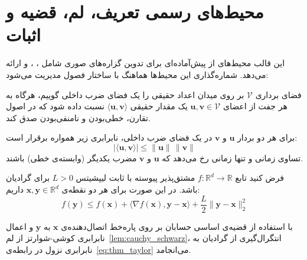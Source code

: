 \section{محیط‌های رسمی تعریف، لم، قضیه و اثبات}\label{sec:2-3}

این قالب محیط‌های از پیش‌آماده‌ای برای تدوین گزاره‌های صوری شامل ، ،  و  ارائه می‌دهد. شماره‌گذاری این محیط‌ها هماهنگ با ساختار فصول مدیریت می‌شود:

\begin{definition}\label{def:inner_product_space}
فضای برداری $\mathcal{V}$ بر روی میدان اعداد حقیقی را یک فضای ضرب داخلی گوییم، هرگاه به هر جفت از اعضای $\mathbf{u}, \mathbf{v} \in \mathcal{V}$ یک مقدار حقیقی $\langle \mathbf{u}, \mathbf{v} \rangle$ نسبت داده شود که در اصول تقارن، خطی‌بودن و نامنفی‌بودن صدق کند.
\end{definition}

\begin{lemma}\label{lem:cauchy_schwarz}
برای هر دو بردار $\mathbf{u}$ و $\mathbf{v}$ در یک فضای ضرب داخلی، نابرابری زیر همواره برقرار است:
\begin{equation}\label{eq:cauchy_schwarz}
    |\langle \mathbf{u}, \mathbf{v} \rangle| \le \|\mathbf{u}\| \, \|\mathbf{v}\|
\end{equation}
تساوی زمانی و تنها زمانی رخ می‌دهد که $\mathbf{u}$ و $\mathbf{v}$ مضرب یکدیگر (وابسته‌ی خطی) باشند.
\end{lemma}

\begin{theorem}\label{thm:taylor_bound}
فرض کنید تابع $f: \mathbb{R}^d \to \mathbb{R}$ مشتق‌پذیر پیوسته با ثابت لیپشیتس $L > 0$ برای گرادیان باشد. در این صورت برای هر دو نقطه‌ی $\mathbf{x}, \mathbf{y} \in \mathbb{R}^d$ داریم:
\begin{equation}\label{eq:thm_taylor}
    f(\mathbf{y}) \le f(\mathbf{x}) + \langle \nabla f(\mathbf{x}), \mathbf{y} - \mathbf{x} \rangle + \frac{L}{2} \|\mathbf{y} - \mathbf{x}\|_2^2
\end{equation}
\end{theorem}

\begin{proofenv}
با استفاده از قضیه‌ی اساسی حسابان بر روی پاره‌خط اتصال‌دهنده‌ی $\mathbf{x}$ به $\mathbf{y}$ و اعمال نابرابری کوشی-شوارتز از لم~\ref{lem:cauchy_schwarz}، انتگرال‌گیری از گرادیان به نابرابری نزول در رابطه‌ی~\eqref{eq:thm_taylor} می‌انجامد.
\end{proofenv}


